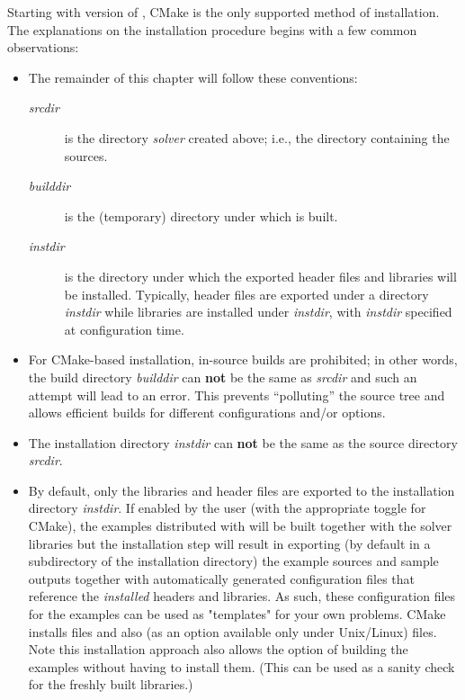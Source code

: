Starting with version  of {\sundials}, CMake is the only supported method
of installation.
The explanations on the installation procedure begins with a few common observations:
\begin{itemize}

\item The remainder of this chapter will follow these conventions:
  \begin{description}
  \item[{\em srcdir}] 
    is the directory {\em solver} created above; i.e., the 
    directory containing the {\sundials} sources.
  \item[{\em builddir}]
    is the (temporary) directory under which {\sundials} is built.
  \item[{\em instdir}]
    is the directory under which the {\sundials} exported header files
    and libraries will be installed. Typically, header files are exported under a directory
    {\em instdir} while libraries are installed under {\em instdir},
    with {\em instdir} specified at configuration time.
  \end{description}

\item For {\sundials} CMake-based installation, in-source builds are prohibited; in other words, the
  build directory {\em builddir} can {\bf not} be the same as {\em srcdir}
  and such an attempt will lead to an error. This
  prevents ``polluting'' the source tree and allows efficient builds
  for different configurations and/or options.

\item {\warn}The installation directory {\em instdir} can {\bf not} be the same as
  the source directory {\em srcdir}.

\item By default, only the libraries and header files are exported to the installation
  directory {\em instdir}.  If enabled by the user (with the
  appropriate toggle for CMake), the
  examples distributed with {\sundials} will be built together with
  the solver libraries but the installation step will result in
  exporting (by default in a subdirectory of the installation
  directory) the example sources and sample outputs together with
  automatically generated configuration files that reference the {\em
  installed} {\sundials} headers and libraries.  As such, these
  configuration files for the {\sundials} examples can be used as
  "templates" for your own problems. CMake installs  files and also
  (as an option available only under Unix/Linux)  files. Note this
  installation approach also allows the option of building the
  {\sundials} examples without having to install them.  (This can be
  used as a sanity check for the freshly built libraries.)


\end{itemize}
